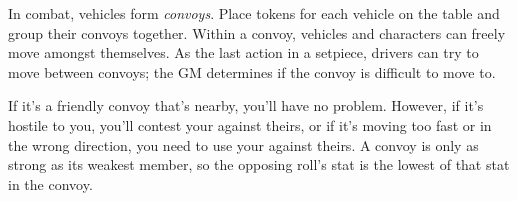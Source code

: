 
In combat, vehicles form \emph{convoys}. Place tokens for each vehicle on the table and group their convoys together. Within a convoy, vehicles and characters can freely move amongst themselves. As the last action in a setpiece, drivers can try to move between convoys; the GM determines if the convoy is difficult to move to.

If it's a friendly convoy that's nearby, you'll have no problem. However, if it's hostile to you, you'll contest your  against theirs, or if it's moving too fast or in the wrong direction, you need to use your  against theirs. A convoy is only as strong as its weakest member, so the opposing roll's stat is the lowest of that stat in the convoy.
